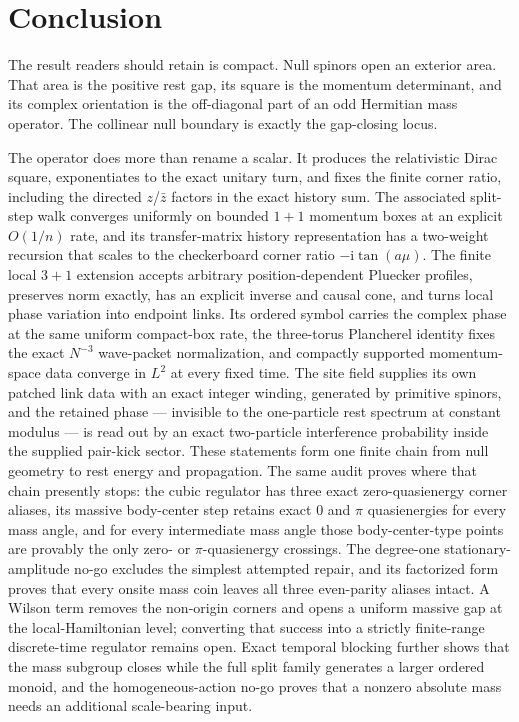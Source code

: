 \documentclass[11pt]{article}
\newcommand{\ii}{\mathrm{i}}
\begin{document}
\section{Conclusion}

The result readers should retain is compact.  Null spinors open an exterior
area.  That area is the positive rest gap, its square is the momentum
determinant, and its complex orientation is the off-diagonal part of an odd
Hermitian mass operator.  The collinear null boundary is exactly the
gap-closing locus.

The operator does more than rename a scalar.  It produces the relativistic
Dirac square, exponentiates to the exact unitary turn, and fixes the finite
corner ratio, including the directed $z$/$\bar z$ factors in the exact history
sum.  The associated split-step walk converges uniformly on bounded
$1+1$ momentum boxes at an explicit $O(1/n)$ rate, and its transfer-matrix
history representation has a two-weight recursion that scales to the
checkerboard corner ratio $-\ii\tan(a\mu)$.  The
   finite local $3+1$ extension accepts arbitrary position-dependent
   Pluecker profiles, preserves norm exactly, has an explicit inverse and
   causal cone, and turns local phase variation into endpoint links.  Its
   ordered symbol carries the complex phase at the same uniform compact-box
   rate, the three-torus Plancherel identity fixes the exact $N^{-3}$
   wave-packet normalization, and compactly supported momentum-space data
   converge in $L^2$ at every fixed time.  The site field supplies its own
   patched link data with an exact integer winding, generated by primitive
   spinors, and the retained phase --- invisible to the one-particle rest
   spectrum at constant modulus --- is read out by an exact two-particle interference
   probability inside the supplied pair-kick sector.  These statements form
   one finite
   chain from null geometry to rest energy and propagation.  The same audit proves where that chain
   presently stops: the cubic regulator has three exact zero-quasienergy corner
   aliases, its massive body-center step retains exact $0$ and $\pi$
   quasienergies for every mass angle, and for every intermediate mass angle
   those body-center-type points are provably the only zero- or
   $\pi$-quasienergy crossings.  The degree-one stationary-amplitude
   no-go excludes the simplest attempted repair, and its factorized form proves
   that every onsite mass coin leaves all three even-parity aliases intact.
   A Wilson term removes the
   non-origin corners and opens a uniform massive gap at the local-Hamiltonian
   level; converting that success into a strictly finite-range discrete-time
   regulator remains open.  Exact temporal blocking further shows that the
   mass subgroup closes while the full split family generates a larger ordered
   monoid, and the homogeneous-action no-go proves that a nonzero absolute
   mass needs an additional scale-bearing input.
\end{document}
